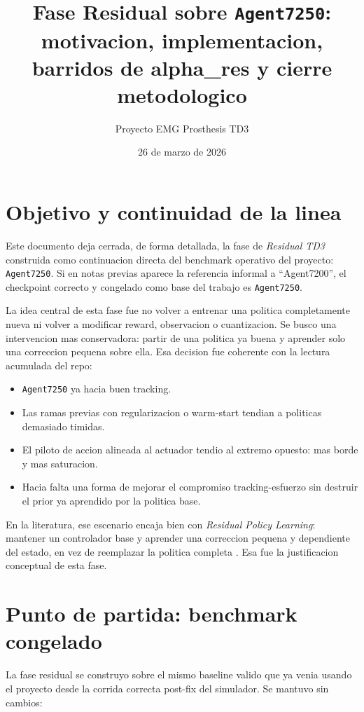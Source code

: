 \documentclass[11pt,a4paper]{article}
\title{Fase Residual sobre \texttt{Agent7250}:\\ motivacion, implementacion, barridos de alpha\_res y cierre metodologico}
\author{Proyecto EMG Prosthesis TD3}
\date{26 de marzo de 2026}
\begin{document}
\maketitle

\section{Objetivo y continuidad de la linea}

Este documento deja cerrada, de forma detallada, la fase de \emph{Residual TD3} construida como continuacion directa del benchmark operativo del proyecto: \texttt{Agent7250}. Si en notas previas aparece la referencia informal a ``Agent7200'', el checkpoint correcto y congelado como base del trabajo es \texttt{Agent7250}.

La idea central de esta fase fue no volver a entrenar una politica completamente nueva ni volver a modificar reward, observacion o cuantizacion. Se busco una intervencion mas conservadora: partir de una politica ya buena y aprender solo una correccion pequena sobre ella. Esa decision fue coherente con la lectura acumulada del repo:

\begin{itemize}[leftmargin=1.6em]
\item \texttt{Agent7250} ya hacia buen tracking.
\item Las ramas previas con regularizacion o warm-start tendian a politicas demasiado timidas.
\item El piloto de accion alineada al actuador tendio al extremo opuesto: mas borde y mas saturacion.
\item Hacia falta una forma de mejorar el compromiso tracking-esfuerzo sin destruir el prior ya aprendido por la politica base.
\end{itemize}

En la literatura, ese escenario encaja bien con \emph{Residual Policy Learning}: mantener un controlador base y aprender una correccion pequena y dependiente del estado, en vez de reemplazar la politica completa \cite{silver2018residual,schaff2020shared,resfit2025}. Esa fue la justificacion conceptual de esta fase.

\section{Punto de partida: benchmark congelado}

La fase residual se construyo sobre el mismo baseline valido que ya venia usando el proyecto desde la corrida correcta post-fix del simulador. Se mantuvo sin cambios:
\end{document}
